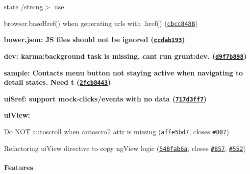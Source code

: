 {\bfseries {\bfseries {\bfseries {\bfseries 
\begin{DoxyItemize}
\item {\bfseries \begin{DoxyParagraph}{state}
/strong$>$ use 
\end{DoxyParagraph}
browser.\+base\+Href() when generating urls with .href() (\href{https://github.com/angular-ui/ui-router/commit/cbcc84887d6b6d35258adabb97c714cd9c1e272d}{\tt cbcc8488})}
\item {\bfseries {\bfseries bower.\+json\+:} JS files should not be ignored (\href{https://github.com/angular-ui/ui-router/commit/ccdab193315f304eb3be5f5b97c47a926c79263e}{\tt ccdab193})}
\item {\bfseries {\bfseries dev\+:} karma\+:background task is missing, can\textquotesingle{}t run grunt\+:dev. (\href{https://github.com/angular-ui/ui-router/commit/d9f7b898e8e3abb8c846b0faa16a382913d7b22b}{\tt d9f7b898})}
\item {\bfseries {\bfseries sample\+:} Contacts menu button not staying active when navigating to detail states. Need t (\href{https://github.com/angular-ui/ui-router/commit/2fcb84437cb43ade12682a92b764f13cac77dfe7}{\tt 2fcb8443})}
\item {\bfseries {\bfseries ui\+Sref\+:} support mock-\/clicks/events with no data (\href{https://github.com/angular-ui/ui-router/commit/717d3ff7d0ba72d239892dee562b401cdf90e418}{\tt 717d3ff7})}
\item {\bfseries {\bfseries ui\+View\+:}
\begin{DoxyItemize}
\item Do N\+OT autoscroll when autoscroll attr is missing (\href{https://github.com/angular-ui/ui-router/commit/affe5bd785cdc3f02b7a9f64a52e3900386ec3a0}{\tt affe5bd7}, closes \href{https://github.com/angular-ui/ui-router/issues/807}{\tt \#807})
\item Refactoring ui\+View directive to copy ng\+View logic (\href{https://github.com/angular-ui/ui-router/commit/548fab6ab9debc9904c5865c8bc68b4fc3271dd0}{\tt 548fab6a}, closes \href{https://github.com/angular-ui/ui-router/issues/857}{\tt \#857}, \href{https://github.com/angular-ui/ui-router/issues/552}{\tt \#552})
\end{DoxyItemize}}
\end{DoxyItemize}}}}}

{\bfseries {\bfseries {\bfseries {\bfseries {\bfseries \paragraph*{Features}}}}}}


